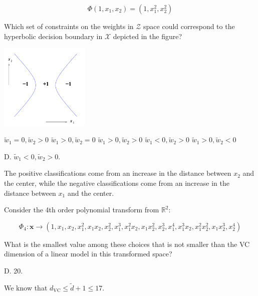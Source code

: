 \documentclass[answers]{exam}
\begin{document}
\[
\Phi(1, x_1, x_2) = (1, x_1^2, x_2^2)
\]

\begin{questions}
\setcounter{question}{1}

\question 
Which set of constraints on the weights in \( \mathcal{Z} \) space could 
correspond to the hyperbolic decision boundary in \( \mathcal{X} \) depicted
in the figure?

\begin{center}
    \includegraphics[width=0.32\textwidth]{img/p5-hyper.png}
\end{center}

\begin{choices}
    \choice \( \tilde{w}_1 = 0, \tilde{w}_2 > 0 \)
    \choice \( \tilde{w}_1 > 0, \tilde{w}_2 = 0 \)
    \choice \( \tilde{w}_1 > 0, \tilde{w}_2 > 0 \)
    \choice \( \tilde{w}_1 < 0, \tilde{w}_2 > 0 \)
    \choice \( \tilde{w}_1 > 0, \tilde{w}_2 < 0 \)
\end{choices}

\begin{solution}
D. \( \tilde{w}_1 < 0, \tilde{w}_2 > 0 \).

The positive classifications come from an increase in the distance
between $x_2$ and the center, while the negative classifications come
from an increase in the distance between $x_1$ and the center. 
\end{solution}

\question Consider the 4th order polynomial transform from \( \mathbb{R}^2 \):

\[
\Phi_4: \textbf{x} \rightarrow (1, x_1, x_2, x_1^2, x_1 x_2, x_2^2, x_1^3, x_1^2 x_2, x_1 x_2^2, 
x_2^3, x_1^4, x_1^3 x_2, x_1^2 x_2^2, x_1 x_2^3, x_2^4)
\]

What is the smallest value among these choices that is not smaller than the VC 
dimension of a linear model in this transformed space?

\begin{choices}
\end{choices}

\begin{solution}
D. 20.

We know that $d_{\text{VC}}\le \tilde{d} + 1 \le 17$.
\end{solution}

\end{questions}
\end{document}
